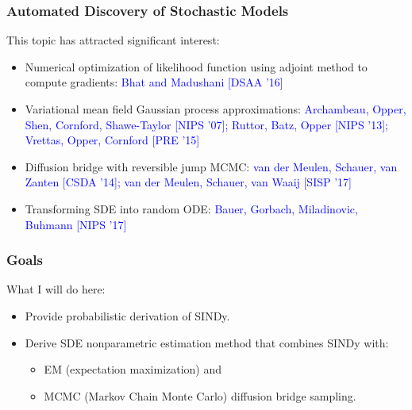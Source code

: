 \documentclass{beamer}
\begin{document}
\begin{frame}
\frametitle{Automated Discovery of Stochastic Models}
\begin{block}{This topic has attracted significant interest:}
\begin{itemize}
\item Numerical optimization of likelihood function using adjoint method to compute gradients: \textcolor{blue}{\small Bhat and Madushani [DSAA '16]}
\item Variational mean field Gaussian process approximations: \textcolor{blue}{\small Archambeau, Opper, Shen, Cornford, Shawe-Taylor [NIPS '07]; Ruttor, Batz, Opper [NIPS '13]; Vrettas, Opper, Cornford [PRE '15]}
\item Diffusion bridge with reversible jump MCMC: \textcolor{blue}{\small van der Meulen, Schauer, van Zanten [CSDA '14]; van der Meulen, Schauer, van Waaij [SISP '17]}
\item Transforming SDE into random ODE: \textcolor{blue}{\small Bauer, Gorbach, Miladinovic, Buhmann [NIPS '17]}
\end{itemize}
\end{block}
\end{frame}

\begin{frame}
\frametitle{Goals}
\begin{block}{What I will do here:}
\begin{itemize}
\item Provide probabilistic derivation of SINDy.
\item Derive SDE nonparametric estimation method that combines SINDy with:
\begin{itemize}
\item EM (expectation maximization) and
\item MCMC (Markov Chain Monte Carlo) diffusion bridge sampling.
\end{itemize}
\end{itemize}
\end{block}
\end{frame}
\end{document}
